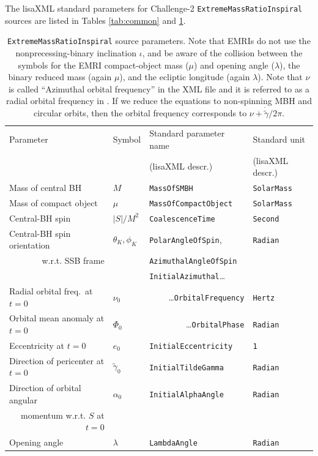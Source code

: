 \documentclass[12pt]{iopart}
\begin{document}
The lisaXML standard parameters for Challenge-2 \texttt{ExtremeMassRatioInspiral} sources are listed in Tables \ref{tab:common} and \ref{tab:emri}.
%
\begin{table}
\begin{tabular}{llll}
\hline
{Parameter} &
{Symbol} &
{Standard parameter name} &
{Standard unit} \\
& & (lisaXML descr.) & (lisaXML descr.) \\
\hline
Mass of central BH     & $M$      & \texttt{MassOfSMBH}           & \texttt{SolarMass} \\
Mass of compact object & $\mu$  & \texttt{MassOfCompactObject}  & \texttt{SolarMass} \\
Central-BH spin        & $|S|/M^2$  & \texttt{CoalescenceTime}      & \texttt{Second} \\
Central-BH spin orientation & $\theta_K, \phi_K$ & \texttt{PolarAngleOfSpin}, & \texttt{Radian} \\
 \multicolumn{1}{r}{w.r.t. SSB frame}  &                         & \texttt{AzimuthalAngleOfSpin} & \\ \hline
& & \texttt{InitialAzimuthal}\ldots & \\                   
Radial orbital freq.\ at $t = 0$ & $\nu_0$ & \multicolumn{1}{r}{\ldots\texttt{OrbitalFrequency}} & \texttt{Hertz} \\
Orbital mean anomaly at $t = 0$ & $\Phi_0$ & \multicolumn{1}{r}{\ldots\texttt{OrbitalPhase}} & \texttt{Radian} \\ \hline
Eccentricity at $t = 0$ & $e_0$ & \texttt{InitialEccentricity} & \texttt{1} \\
Direction of pericenter at $t = 0$ & $\tilde{\gamma}_0$ & \texttt{InitialTildeGamma} & \texttt{Radian} \\
Direction of orbital angular & $\alpha_0$ & \texttt{InitialAlphaAngle} & \texttt{Radian} \\
\multicolumn{1}{r}{momentum w.r.t. $S$ at $t = 0$} & & & \\
Opening angle & $\lambda$ & \texttt{LambdaAngle} & \texttt{Radian} \\ 
\hline
\end{tabular}
\caption{\texttt{ExtremeMassRatioInspiral} source parameters. Note that EMRIs do not use the nonprecessing-binary inclination $\iota$, and be aware of the collision between the symbols for the EMRI compact-object mass ($\mu$) and opening angle ($\lambda$), the binary reduced mass (again $\mu$), and the ecliptic longitude (again $\lambda$). Note that $\nu$ is called ``Azimuthal orbital frequency'' in the XML file and it is referred to as a radial orbital frequency in \cite{BC}.
If we reduce the equations to non-spinning MBH and circular orbits, then 
the orbital frequency corresponds to $\nu + \dot{\tilde{\gamma}}/{2\pi}$.
\label{tab:emri}}
\end{table}
\end{document}
